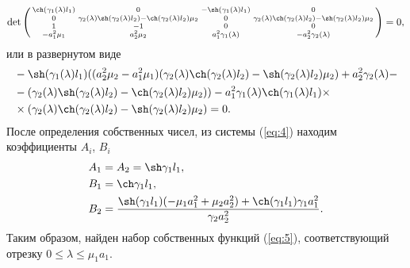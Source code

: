 \documentclass[12pt, a4paper]{article}
\begin{document}
\begin{equation}
  \det \left(  
  \begin{smallmatrix}
    \ch(\gamma_1(\lambda) l_1) & 0 & -\sh(\gamma_1(\lambda) l_1) & 0 \\
    0 & \gamma_2(\lambda) \sh(\gamma_2(\lambda) l_2)-\ch(\gamma_2(\lambda) l_2) \mu_2 & 0 & \gamma_2(\lambda) \ch(\gamma_2(\lambda) l_2)-\sh(\gamma_2(\lambda) l_2) \mu_2 \\
    1 & -1 & 0 & 0 \\
    -a_1^2 \mu_1 & a_2^2 \mu_2 & a_1^2 \gamma_1(\lambda) & -a_2^2 \gamma_2(\lambda) \\
  \end{smallmatrix}
  \right) = 0,
\end{equation}
или в развернутом виде
\begin{equation}
  \begin{aligned}
  & -\sh(\gamma_1(\lambda) l_1) ((a_2^2 \mu_2-a_1^2 \mu_1) (\gamma_2(\lambda) \ch(\gamma_2(\lambda) l_2)-\sh(\gamma_2(\lambda) l_2) \mu_2)+a_2^2 \gamma_2(\lambda)- \\
  & -(\gamma_2(\lambda) \sh(\gamma_2(\lambda) l_2)-\ch(\gamma_2(\lambda) l_2) \mu_2))-a_1^2 \gamma_1(\lambda) \ch(\gamma_1(\lambda) l_1) \times \\
  & \times (\gamma_2(\lambda) \ch(\gamma_2(\lambda) l_2)-\sh(\gamma_2(\lambda) l_2) \mu_2) = 0.
  \end{aligned}
  \label{eq:19}
\end{equation}
После определения собственных чисел, из системы (\ref{eq:4}) находим коэффициенты $A_i$, $B_i$
\begin{equation}
  \begin{aligned}
    & A_1 = A_2 = \sh \gamma_1l_1, \\
    & B_1 = \ch \gamma_1l_1, \\
    & B_2 = \frac{\sh (\gamma_1l_1) (-\mu_1 a_1^2 + \mu_2 a_2^2) + \ch (\gamma_1l_1) \gamma_1 a_1^2}{\gamma_2a_2^2}.
  \end{aligned}
\end{equation}
Таким образом, найден набор собственных функций (\ref{eq:5}), соответствующий отрезку $ 0 \le \lambda \le \mu_1a_1 $.
\end{document}
